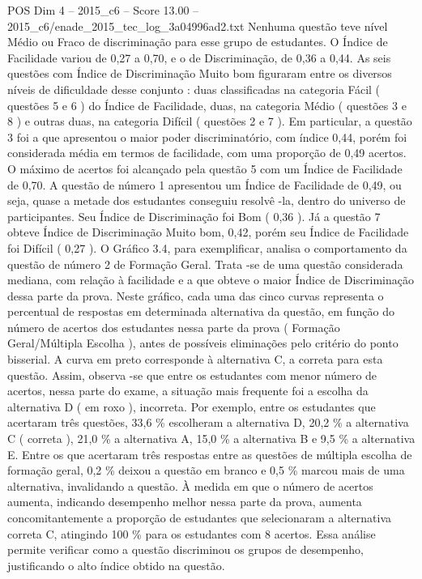 \begin{textsample}{POS Dim 4 – 2015\_c6 – Score 13.00 – 2015\_c6/enade\_2015\_tec\_log\_3a04996ad2.txt}
Nenhuma questão teve nível Médio ou Fraco de discriminação para esse grupo de estudantes.
O Índice de Facilidade variou de 0,27 a 0,70, e o de Discriminação, de 0,36 a 0,44.
As seis questões com Índice de Discriminação Muito bom figuraram entre os diversos níveis de dificuldade desse conjunto : duas classificadas na categoria Fácil ( questões 5 e 6 ) do Índice de Facilidade, duas, na categoria Médio ( questões 3 e 8 ) e outras duas, na categoria Difícil ( questões 2 e 7 ).
Em particular, a questão 3 foi a que apresentou o maior poder discriminatório, com índice 0,44, porém foi considerada média em termos de facilidade, com uma proporção de 0,49 acertos.
O máximo de acertos foi alcançado pela questão 5 com um Índice de Facilidade de 0,70.
A questão de número 1 apresentou um Índice de Facilidade de 0,49, ou seja, quase a metade dos estudantes conseguiu resolvê -la, dentro do universo de participantes.
Seu Índice de Discriminação foi Bom ( 0,36 ).
Já a questão 7 obteve Índice de Discriminação Muito bom, 0,42, porém seu Índice de Facilidade foi Difícil ( 0,27 ).
O Gráfico 3.4, para exemplificar, analisa o comportamento da questão de número 2 de Formação Geral.
Trata -se de uma questão considerada mediana, com relação à facilidade e a que obteve o maior Índice de Discriminação dessa parte da prova.
Neste gráfico, cada uma das cinco curvas representa o percentual de respostas em determinada alternativa da questão, em função do número de acertos dos estudantes nessa parte da prova ( Formação Geral/Múltipla Escolha ), antes de possíveis eliminações pelo critério do ponto bisserial.
A curva em preto corresponde à alternativa C, a correta para esta questão.
Assim, observa -se que entre os estudantes com menor número de acertos, nessa parte do exame, a situação mais frequente foi a escolha da alternativa D ( em roxo ), incorreta.
Por exemplo, entre os estudantes que acertaram três questões, 33,6 \% escolheram a alternativa D, 20,2 \% a alternativa C ( correta ), 21,0 \% a alternativa A, 15,0 \% a alternativa B e 9,5 \% a alternativa E.
Entre os que acertaram três respostas entre as questões de múltipla escolha de formação geral, 0,2 \% deixou a questão em branco e 0,5 \% marcou mais de uma alternativa, invalidando a questão.
À medida em que o número de acertos aumenta, indicando desempenho melhor nessa parte da prova, aumenta concomitantemente a proporção de estudantes que selecionaram a alternativa correta C, atingindo 100 \% para os estudantes com 8 acertos.
Essa análise permite verificar como a questão discriminou os grupos de desempenho, justificando o alto índice obtido na questão.

\end{textsample}

